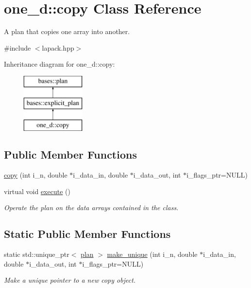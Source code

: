 \hypertarget{classone__d_1_1copy}{\section{one\-\_\-d\-:\-:copy Class Reference}
\label{classone__d_1_1copy}
}


A plan that copies one array into another.  




{\ttfamily \#include $<$lapack.\-hpp$>$}

Inheritance diagram for one\-\_\-d\-:\-:copy\-:\begin{figure}[H]
\begin{center}
\leavevmode
\includegraphics[height=3.000000cm]{classone__d_1_1copy}
\end{center}
\end{figure}
\subsection*{Public Member Functions}
\begin{DoxyCompactItemize}
\item 
\hyperlink{classone__d_1_1copy_aa6fb1d819967a3e95a8b7ebde4212261}{copy} (int i\-\_\-n, double $\ast$i\-\_\-data\-\_\-in, double $\ast$i\-\_\-data\-\_\-out, int $\ast$i\-\_\-flags\-\_\-ptr=N\-U\-L\-L)
\begin{DoxyCompactList}\small\item\em \end{DoxyCompactList}\item 
virtual void \hyperlink{classone__d_1_1copy_a89443bd9de8cc907a1d9a9334aeb9f35}{execute} ()
\begin{DoxyCompactList}\small\item\em Operate the plan on the data arrays contained in the class. \end{DoxyCompactList}\end{DoxyCompactItemize}
\subsection*{Static Public Member Functions}
\begin{DoxyCompactItemize}
\item 
static std\-::unique\-\_\-ptr$<$ \hyperlink{classbases_1_1plan_a7b4ddc2f876b9e4dcf899feb20ae369f}{plan} $>$ \hyperlink{classone__d_1_1copy_a0519713b55f644a402b38557d71970a5}{make\-\_\-unique} (int i\-\_\-n, double $\ast$i\-\_\-data\-\_\-in, double $\ast$i\-\_\-data\-\_\-out, int $\ast$i\-\_\-flags\-\_\-ptr=N\-U\-L\-L)
\begin{DoxyCompactList}\small\item\em Make a unique pointer to a new copy object. \end{DoxyCompactList}\end{DoxyCompactItemize}
